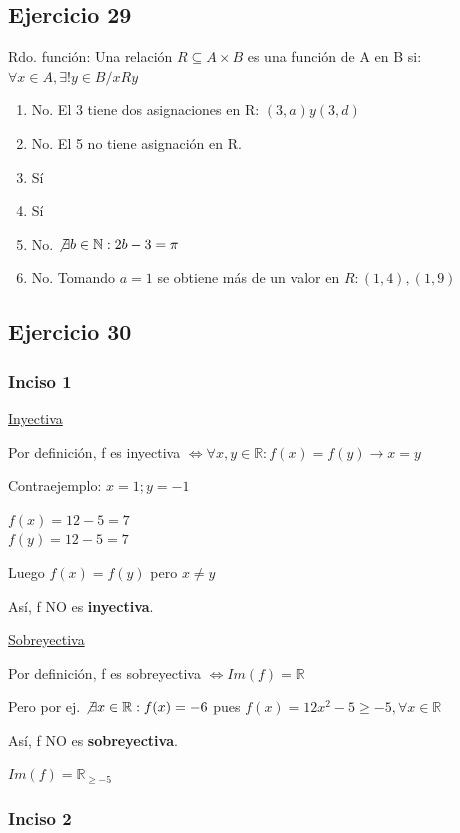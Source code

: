 \subsection{Ejercicio 29}
Rdo. función: Una relación $R \subseteq A\times B$ es una función de A en B si: $\forall x \in A, \exists ! y \in B / xRy$

\begin{enumerate}[label=(\alph*)]
    \item No. El 3 tiene dos asignaciones en R: $(3,a) y (3,d)$
    \item No. El 5 no tiene asignación en R.
    \item Sí
    \item Sí
    \item No. $\not \exists b \in \mathbb{N}: 2b-3 = \pi$
    \item No. Tomando $a = 1$ se obtiene más de un valor en $R: (1,4), (1,9)$
\end{enumerate}

\subsection{Ejercicio 30}

\subsubsection{Inciso 1}

\underline{Inyectiva}

Por definición, f es inyectiva $\iff \forall x, y \in \mathbb{R}: f(x) = f(y) \rightarrow x = y$

Contraejemplo: $x = 1; y=-1$

$f(x) = 12-5 = 7$\\
$f(y) = 12-5 = 7$

Luego $f(x) = f(y)$ pero $x \neq y$

Así, f NO es \textbf{inyectiva}.

\underline{Sobreyectiva}

Por definición, f es sobreyectiva $\iff Im(f) = \mathbb{R}$

Pero por ej. $\not \exists x \in \mathbb{R}: f(x) = -6$ pues $f(x) = 12x^2 -5 \geq -5, \forall x \in \mathbb{R}$

Así, f NO es \textbf{sobreyectiva}.

$Im(f) = \mathbb{R}_{\geq -5}$

\subsubsection{Inciso 2}

